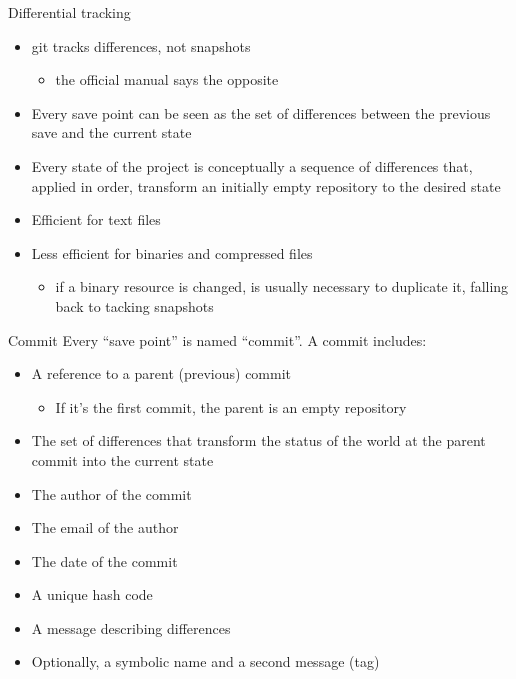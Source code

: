 \documentclass[presentation]{beamer}
\begin{document}
\begin{frame}{Differential tracking}
    \begin{itemize}
        \item git tracks differences, not snapshots
        \begin{itemize}
            \item the official manual says the opposite
        \end{itemize}
        \item Every save point can be seen as the set of differences between the previous save and the current state
        \item Every state of the project is conceptually a sequence of differences that, applied in order, transform an initially empty repository to the desired state
        \item Efficient for text files
        \item Less efficient for binaries and compressed files
        \begin{itemize}
            \item if a binary resource is changed, is usually necessary to duplicate it, falling back to tacking snapshots
        \end{itemize}
    \end{itemize}
\end{frame}

\begin{frame}{Commit}
    Every ``save point'' is named ``commit''. A commit includes:
    \begin{itemize}
        \item A reference to a parent (previous) commit
        \begin{itemize}
            \item If it's the first commit, the parent is an empty repository
        \end{itemize}
        \item The set of differences that transform the status of the world at the parent commit into the current state
        \item The author of the commit
        \item The email of the author
        \item The date of the commit
        \item A unique hash code
        \item A message describing differences
        \item Optionally, a symbolic name and a second message (tag)
    \end{itemize}
\end{frame}
\end{document}
